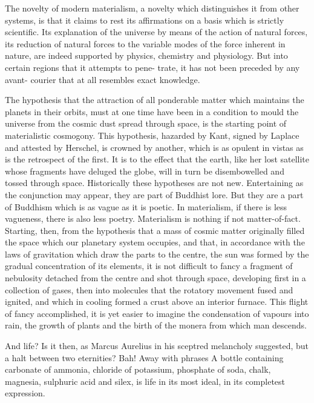 \documentclass[]{book}
\begin{document}
The novelty of modern materialism, a novelty which distinguishes it from
other systems, is that it claims to rest its affirmations on a basis
which is strictly scientific. Its explanation of the universe by means
of the action of natural forces, its reduction of natural forces to the
variable modes of the force inherent in nature, are indeed supported by
physics, chemistry and physiology. But into certain regions that it
attempts to pene- trate, it has not been preceded by any avant- courier
that at all resembles exact knowledge.

The hypothesis that the attraction of all ponderable matter which
maintains the planets in their orbits, must at one time have been in a
condition to mould the universe from the cosmic dust spread through
space, is the starting point of materialistic cosmogony. This
hypothesis, hazarded by Kant, signed by Laplace and attested by
Herschel, is crowned by another, which is as opulent in vistas as is the
retrospect of the first. It is to the effect that the earth, like her
lost satellite whose fragments have deluged the globe, will in turn be
disembowelled and tossed through space. Historically these hypotheses
are not new. Entertaining as the conjunction may appear, they are part
of Buddhist lore. But they are a part of Buddhism which is as vague as
it is poetic. In materialism, if there is less vagueness, there is also
less poetry. Materialism is nothing if not matter-of-fact. Starting,
then, from the hypothesis that a mass of cosmic matter originally filled
the space which our planetary system occupies, and that, in accordance
with the laws of gravitation which draw the parts to the centre, the sun
was formed by the gradual concentration of its elements, it is not
difficult to fancy a fragment of nebulosity detached from the centre and
shot through space, developing first in a collection of gases, then into
molecules that the rotatory movement fused and ignited, and which in
cooling formed a crust above an interior furnace. This flight of fancy
accomplished, it is yet easier to imagine the condensation of vapours
into rain, the growth of plants and the birth of the monera from which
man descends.

And life? Is it then, as Marcus Aurelius in his sceptred melancholy
suggested, but a halt between two eternities? Bah! Away with phrases A
bottle containing carbonate of ammonia, chloride of potassium, phosphate
of soda, chalk, magnesia, sulphuric acid and silex, is life in its most
ideal, in its completest expression.
\end{document}

